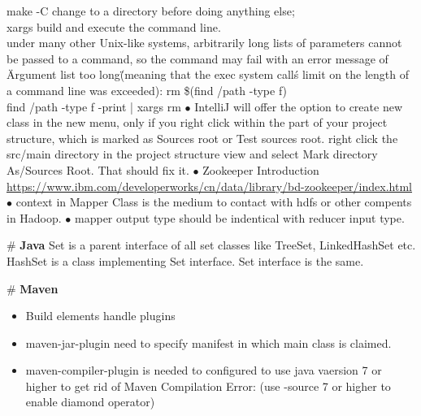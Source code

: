 make -C change to a directory before doing anything else;\\
xargs build and execute the command line.\\
under many other Unix-like systems, arbitrarily long lists of parameters cannot be passed to a command, so the command may fail with an error message of \"Argument list too long\" (meaning that the exec system call\'s limit on the length of a command line was exceeded): rm \$(find /path -type f)\\
find /path -type f -print | xargs rm
\bigskip\newline
$\bullet$   {\color{red}IntelliJ} will offer the option to create new class in the new menu, only if you right click within the part of your project structure, which is marked as Sources root or Test sources root.  right click the src/main directory in the project structure view and select Mark directory As/Sources Root. That should fix it.\bigskip
\newline
$\bullet$ {\color{green}Zookeeper Introduction} \url{https://www.ibm.com/developerworks/cn/data/library/bd-zookeeper/index.html}
\newline$\bullet$ context in Mapper Class is the medium to contact with hdfs or other compents in Hadoop.
\newline$\bullet$ mapper output type should be indentical with reducer input type.

\# \textbf{Java}
Set is a parent interface of all set classes like TreeSet, LinkedHashSet etc. HashSet is a class implementing Set interface. Set interface is the same.

\# \textbf{Maven}
\begin{itemize}
\item Build elements handle plugins
\item maven-jar-plugin need to specify manifest in which main class is claimed.
\item maven-compiler-plugin is needed to configured to use java vaersion 7 or higher to get rid of Maven Compilation Error: (use -source 7 or higher to enable diamond operator)


\end{itemize}
